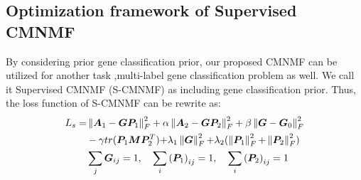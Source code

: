 \documentclass{bmcart}
\begin{document}
\subsection*{\textbf{Optimization framework of Supervised CMNMF}}
By considering prior gene classification prior, our proposed CMNMF can be utilized for another task ,multi-label gene classification problem as well. We call it Supervised CMNMF (S-CMNMF) as including gene classification prior. Thus, the loss function of S-CMNMF can be rewrite as:
\begin{equation}\label{obj:Sup-CMNMF}
\begin{split}
L_s =
&\left\| {{\bm{A}_1} - \bm{G}{\bm{P}_1}} \right\|_F^2 + \alpha \left\| {{\bm{A}_2} - \bm{G}{\bm{P}_2}} \right\|_F^2 +\beta\left\| {\bm{G} - {\bm{G}_0}}\right\|_F^2\\
&- \gamma tr({\bm{P}_1}\bm{MP}_2^T){\rm{ + }}{\lambda _1}\left\| \bm{G} \right\|_F^2{\rm{ + }}{\lambda _2}(\left\| {{\bm{P}_1}} \right\|_F^2{\rm{ + }}\left\| {{\bm{P}_2}} \right\|_F^2)\\
&\sum_j\bm{G}_{ij}=1,\quad \sum_i{(\bm{P}_1)}_{ij}=1,\quad \sum_i{(\bm{P}_2)}_{ij}=1
\end{split}
\end{equation}
\end{document}
